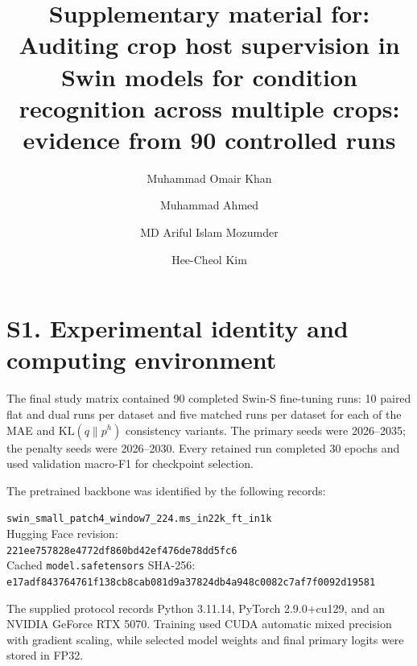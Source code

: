 \documentclass[preprint,12pt]{elsarticle}
\begin{document}
\begin{frontmatter}

\title{Supplementary material for: Auditing crop host supervision in Swin models for condition recognition across multiple crops: evidence from 90 controlled runs}

\author[inst1]{Muhammad Omair Khan}
\author[inst1]{Muhammad Ahmed}
\author[inst1]{MD Ariful Islam Mozumder}
\author[inst2]{Hee-Cheol Kim}
\address[inst1]{Institute of Digital Anti-Aging Healthcare, Inje University,
Gimhae 50834, Republic of Korea.}
\address[inst2]{Department of Computer Science and Engineering, Inje University,
Gimhae 50834, Republic of Korea.}

\end{frontmatter}

\section*{S1. Experimental identity and computing environment}

The final study matrix contained 90 completed Swin-S fine-tuning runs: 10
paired flat and dual runs per dataset and five matched runs per dataset for each
of the MAE and $\mathrm{KL}(q\|p^h)$ consistency variants. The primary seeds
were 2026--2035; the penalty seeds were 2026--2030. Every retained run completed
30 epochs and used validation macro-F1 for checkpoint selection.

The pretrained backbone was identified by the following records:
\begin{center}
\small
\texttt{swin\_small\_patch4\_window7\_224.ms\_in22k\_ft\_in1k}\\
Hugging Face revision: \\
\texttt{221ee757828e4772df860bd42ef476de78dd5fc6}\\
Cached \texttt{model.safetensors} SHA-256: \\
\texttt{e17adf843764761f138cb8cab081d9a37824db4a948c0082c7af7f0092d19581}
\end{center}
The supplied protocol records Python 3.11.14, PyTorch 2.9.0+cu129, and an NVIDIA
GeForce RTX 5070. Training used CUDA automatic mixed precision with gradient
scaling, while selected model weights and final primary logits were stored in
FP32.

\begin{table}[H]
\centering
\caption{Locked split-manifest identities recorded by the experiment protocol.}
\label{tab:s1-manifests}
\small
{}
\end{table}
\end{document}
